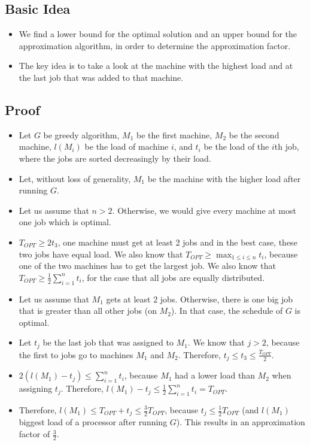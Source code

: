 \documentclass[12pt]{article}
\begin{document}
\subsection*{Basic Idea}
\begin{itemize}
	\item We find a lower bound for the optimal solution and an upper bound for the approximation algorithm, in order to determine the approximation factor.
	\item The key idea is to take a look at the machine with the highest load and at the last job that was added to that machine.
\end{itemize}

\subsection*{Proof}
\begin{itemize}
	\item Let $G$ be greedy algorithm, $M_1$ be the first machine, $M_2$ be the second machine, $l(M_i)$ be the load of machine $i$, and $t_i$ be the load of the $i$th job, where the jobs are sorted decreasingly by their load.
	\item Let, without loss of generality, $M_1$ be the machine with the higher load after running $G$.
	\item Let us assume that $n > 2$. Otherwise, we would give every machine at most one job which is optimal.
	\item $T_\mathit{OPT} \geq 2 t_3$, one machine must get at least 2 jobs and in the best case, these two jobs have equal load. We also know that $T_\mathit{OPT} \geq \max_{1 \leq i \leq n} t_i$, because one of the two machines has to get the largest job. We also know that $T_\mathit{OPT} \geq \frac{1}{2} \sum_{i=1}^n t_i$, for the case that all jobs are equally distributed.
	\item Let us assume that $M_1$ gets at least 2 jobs. Otherwise, there is one big job that is greater than all other jobs (on $M_2$). In that case, the schedule of $G$ is optimal.
	\item Let $t_j$ be the last job that was assigned to $M_1$. We know that $j > 2$, because the first to jobs go to machines $M_1$ and $M_2$. Therefore, $t_j \leq t_3 \leq \frac{T_\mathit{OPT}}{2}$.
	\item $2(l(M_1) - t_j) \leq \sum_{i=1}^n t_i$, because $M_1$ had a lower load than $M_2$ when assigning $t_j$. Therefore, $l(M_1) - t_j \leq \frac{1}{2} \sum_{i=1}^n t_i = T_\mathit{OPT}$. 
	\item Therefore, $l(M_1) \leq T_\mathit{OPT} + t_j \leq \frac{3}{2} T_\mathit{OPT}$, because $t_j \leq \frac{1}{2} T_\mathit{OPT}$ (and $l(M_1)$ biggest load of a processor after running $G$). This results in an approximation factor of $\frac{3}{2}$.
	
	
\end{itemize}
\end{document}
